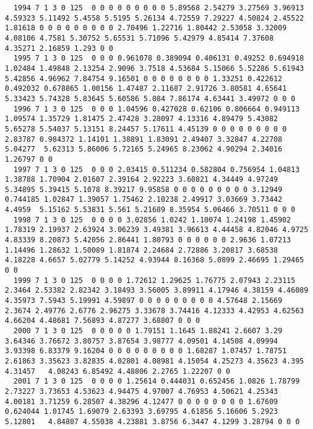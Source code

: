 \begin{landscape}
{\begin{verbatim}
  1994 7 1 3 0 125  0 0 0 0 0 0 0 0 0 5.89568 2.54279 3.27569 3.96913 4.59323 5.11492 5.4558 5.5195 5.26134 4.72559 7.29227 4.50824 2.45522 1.81618 0 0 0 0 0 0 0 0 0 2.70496 1.22716 1.80442 2.53058 3.32009 4.08106 4.7581 5.30752 5.65531 5.71096 5.42979 4.85414 7.37608   4.35271 2.16859 1.293 0 0
  1995 7 1 3 0 125  0 0 0 0.961078 0.389094 0.406131 0.49252 0.694918 1.02484 1.49848 2.13254 2.9096 3.7518 4.53684 5.15066 5.52286 5.61943 5.42856 4.96962 7.84754 9.16501 0 0 0 0 0 0 0 0 1.33251 0.422612 0.492032 0.678865 1.00156 1.47487 2.11687 2.91726 3.80581 4.65641   5.33423 5.74328 5.83645 5.60586 5.084 7.86174 4.63441 3.49972 0 0 0
  1996 7 1 3 0 125  0 0 0 1.04596 0.427028 0.62106 0.806664 0.949113 1.09574 1.35729 1.81475 2.47428 3.28097 4.13316 4.89479 5.43082 5.65278 5.54037 5.13151 8.24457 5.17611 4.45139 0 0 0 0 0 0 0 0 0 2.83787 0.984372 1.14101 1.38891 1.83091 2.49407 3.32847 4.22708 5.04277  5.62313 5.86006 5.72165 5.24965 8.23062 4.90294 2.34016 1.26797 0 0
  1997 7 1 3 0 125  0 0 0 2.03415 0.511234 0.582804 0.756954 1.04813 1.38788 1.70904 2.01607 2.39164 2.92223 3.60821 4.34449 4.97249 5.34895 5.39415 5.1078 8.39217 9.95858 0 0 0 0 0 0 0 0 0 3.12949 0.744185 1.02847 1.39057 1.75462 2.10238 2.49917 3.03669 3.73442 4.4959  5.15162 5.53831 5.561 5.21689 8.35954 5.06466 3.70511 0 0 0
  1998 7 1 3 0 125  0 0 0 0 3.02856 1.0242 1.10074 1.24198 1.45902 1.78319 2.19937 2.63924 3.06239 3.49381 3.96613 4.44458 4.82046 4.9725 4.83339 8.20873 5.42056 2.86441 1.80793 0 0 0 0 0 0 2.9636 1.07213 1.14496 1.28632 1.50089 1.81874 2.24684 2.72886 3.20817 3.68538   4.18228 4.6657 5.02779 5.14252 4.93944 8.16368 5.0899 2.46695 1.29465 0 0
  1999 7 1 3 0 125  0 0 0 0 1.72612 1.29625 1.76775 2.07943 2.23115 2.3464 2.53382 2.82342 3.18493 3.56005 3.89911 4.17946 4.38159 4.46089 4.35973 7.5943 5.19991 4.59897 0 0 0 0 0 0 0 0 0 4.57648 2.15669 2.3674 2.49776 2.6776 2.96275 3.33678 3.74416 4.12333 4.42953 4.62563  4.66204 4.48681 7.56893 4.87277 3.68807 0 0 0
  2000 7 1 3 0 125  0 0 0 0 0 1.79151 1.1645 1.88241 2.6607 3.29 3.64346 3.76672 3.80757 3.87654 3.98777 4.09501 4.14508 4.09994 3.93398 6.83379 9.16204 0 0 0 0 0 0 0 0 0 1.68287 1.07457 1.78751 2.61863 3.35623 3.82835 4.02801 4.08981 4.15054 4.25273 4.35623 4.395 4.31457   4.08243 6.85492 4.48806 2.2765 1.22207 0 0
  2001 7 1 3 0 125  0 0 0 0 1.25614 0.444031 0.652456 1.0826 1.78799 2.73227 3.73653 4.53623 4.94475 4.97007 4.76953 4.50621 4.25343 4.00181 3.71259 6.28507 4.38296 4.12477 0 0 0 0 0 0 0 0 1.67609 0.624044 1.01745 1.69079 2.63393 3.69795 4.61856 5.16606 5.2923 5.12801   4.84807 4.55038 4.23881 3.8756 6.3447 4.1299 3.28794 0 0 0

\end{verbatim}}
\end{landscape}
